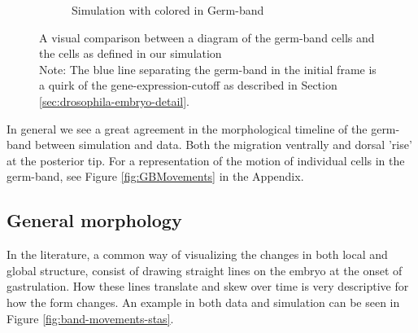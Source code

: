 \begin{figure}[H]
\begin{subfigure}[b]{0.61\textwidth}
    \caption{Simulation with colored in Germ-band}
    \end{subfigure}
    \caption{A visual comparison between a diagram of the germ-band cells and the cells as defined in our simulation\\Note: The blue line separating the germ-band in the initial frame is a quirk of the gene-expression-cutoff as described in Section \ref{sec:drosophila-embryo-detail}.}
    \label{fig:germbandCompare}
\end{figure}


In general we see a great agreement in the morphological timeline of the germ-band between simulation and data. Both the migration ventrally and dorsal 'rise' at the posterior tip. For a representation of the motion of individual cells in the germ-band, see Figure \ref{fig:GBMovements} in the Appendix.


\subsection{General morphology}
In the literature, a common way of visualizing the changes in both local and global structure, consist of drawing straight lines on the embryo at the onset of gastrulation. How these lines translate and skew over time is very descriptive for how the form changes. An example in both data and simulation can be seen in Figure \ref{fig:band-movements-stas}.

